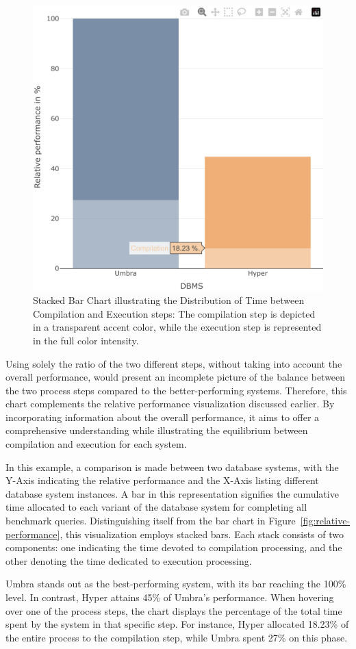 \begin{figure}[h]
  \centering
  \includegraphics[width=0.5\linewidth]{figures/bsp-compilation-execution.png}
  \caption{Stacked Bar Chart illustrating the Distribution of Time between Compilation and Execution steps: The compilation step is depicted in a transparent accent color, while the execution step is represented in the full color intensity.}
  \label{fig:execution-compilation}
\end{figure}

Using solely the ratio of the two different steps, without taking into account the overall performance, would present an incomplete picture of the balance between the two process steps compared to the better-performing systems. Therefore, this chart complements the relative performance visualization discussed earlier. By incorporating information about the overall performance, it aims to offer a comprehensive understanding while illustrating the equilibrium between compilation and execution for each system.

In this example, a comparison is made between two database systems, with the Y-Axis indicating the relative performance and the X-Axis listing different database system instances. A bar in this representation signifies the cumulative time allocated to each variant of the database system for completing all benchmark queries. Distinguishing itself from the bar chart in Figure~\ref*{fig:relative-performance}, this visualization employs stacked bars. Each stack consists of two components: one indicating the time devoted to compilation processing, and the other denoting the time dedicated to execution processing.

Umbra stands out as the best-performing system, with its bar reaching the 100\% level. In contrast, Hyper attains 45\% of Umbra's performance. When hovering over one of the process steps, the chart displays the percentage of the total time spent by the system in that specific step. For instance, Hyper allocated 18.23\% of the entire process to the compilation step, while Umbra spent 27\% on this phase.

